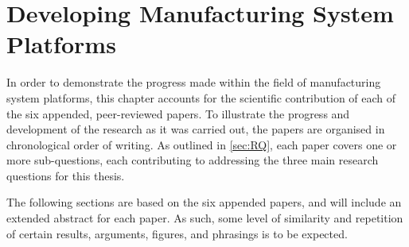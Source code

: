 \chapter{Developing Manufacturing System Platforms}\label{chp:prodPltfDev}
In order to demonstrate the progress made within the field of manufacturing system platforms, this chapter accounts for the scientific contribution of each of the six appended, peer-reviewed papers.
To illustrate the progress and development of the research as it was carried out, the papers are organised in chronological order of writing.
As outlined in \cref{sec:RQ}, each paper covers one or more sub-questions, each contributing to addressing the three main research questions for this thesis.

The following sections are based on the six appended papers, and will include an extended abstract for each paper.
As such, some level of similarity and repetition of certain results, arguments, figures, and phrasings is to be expected.











